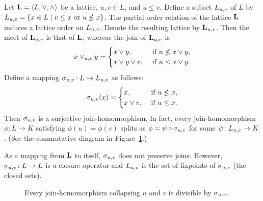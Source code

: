 \begin{example}
  Let $\mathbf{L} = \langle L, \vee, \wedge\rangle$ be a lattice, $u, v \in L$, and $u\leq v$.
  Define a subset $L_{u,v}$ of $L$ by
  $L_{u,v} =\{x\in L \mid v\leq x \text{ or } u \nleq x\}$.
  The partial order relation of the lattice $\mathbf{L}$ induces a lattice order on
  $L_{u,v}$. Denote the resulting lattice by $\mathbf{L}_{u,v}$.
  Then the meet of $\mathbf{L}_{u,v}$ is that of $\mathbf{L}$, whereas the join of $\mathbf{L}_{u,v}$ is
  \[
  x \vee_{u,v} y = 
  \begin{cases}
    x \vee y, & \text{ if $u \nleq x \vee y$,}\\
    x \vee y \vee v, & \text{ if $u \leq x \vee y$.}
  \end{cases}
  \]
  Define a mapping $\sigma_{u,v} \colon L \to L_{u,v}$ as follows:
  \[
  \sigma_{u,v} (x)  = 
  \begin{cases}
    x, & \text{ if $u \nleq x$,}\\
    x \vee v, & \text{ if $u \leq x$.}
  \end{cases}
  \]
  Then $\sigma_{u,v}$ is a surjective join-homomorphism. In fact, every
  join-homomorphism $\phi \colon L \to K$ satisfying $\phi(u) = \phi(v)$ splits as
  $\phi =  \psi \circ \sigma_{u,v}$ for some $\psi \colon L_{u,v} \to K$.
  (See the commutative diagram in Figure~\ref{fig:splitting}.)

  As a mapping from $\mathbf{L}$ to itself, $\sigma_{u,v}$ does not preserve joins. However,
  $\sigma_{u,v} \colon L \to L$ is a closure operator and 
  $L_{u,v}$ is the set of fixpoints of $\sigma_{u,v}$ (the closed sets).

  \begin{center}
    \begin{figure}
      \caption{Every join-homomorphism collapsing $u$ and $v$ is divisible by $\sigma_{u,v}$.}
      \label{fig:splitting}
    \end{figure}
  \end{center}

  
\end{example}



